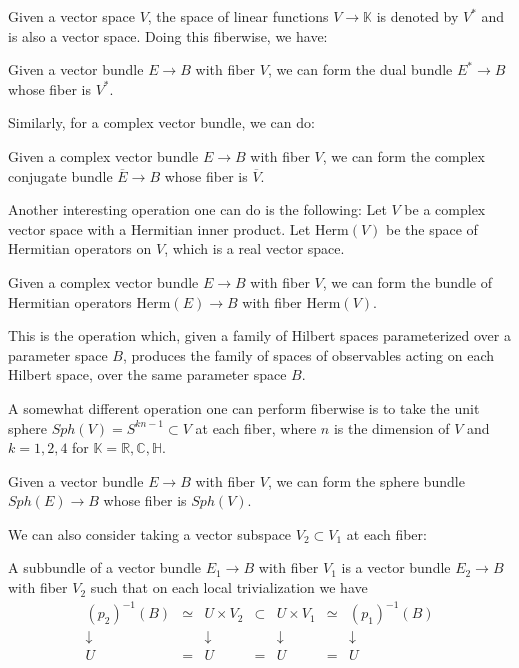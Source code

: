 \documentclass[12pt]{article}
\numberwithin{equation}{section}
\theoremstyle{remark}
\def\bC{\mathbb{C}}
\def\bH{\mathbb{H}}
\def\bK{\mathbb{K}}
\def\bR{\mathbb{R}}
\let\bar\overline
\begin{document}
Given a vector space $V$, the space of linear functions $V\to \bK$ is denoted by $V^*$
and is also a  vector space.
Doing this fiberwise, we have:
\begin{definition}
  Given a vector bundle $E\to B$ with fiber $V$,
  we can form the dual bundle $E^*\to B$ whose fiber is $V^*$.
\end{definition}
Similarly, for a complex vector bundle, we can do:
\begin{definition}
  Given a complex vector bundle $E\to B$ with fiber $V$,
  we can form the complex conjugate bundle $\bar E\to B$ whose fiber is $\bar V$.
\end{definition}


Another interesting operation one can do is the following:
Let $V$ be a complex vector space with a Hermitian inner product.
Let $\mathrm{Herm}(V)$ be the space of Hermitian operators on $V$,
which is a real vector space.
\begin{definition}
  Given a complex vector bundle $E\to B$ with fiber $V$,
  we can form the bundle of Hermitian operators $\mathrm{Herm}(E)\to B$ with fiber $\mathrm{Herm}(V)$.
\end{definition}
This is the operation which, given a family of Hilbert spaces parameterized over 
a parameter space $B$,
produces the family of spaces of observables acting on each Hilbert space, over the same parameter space $B$.

A somewhat different operation one can perform fiberwise 
is to take the unit sphere $Sph(V)=S^{kn-1} \subset V$ at each fiber, where $n$ is the dimension of $V$
and $k=1,2,4$ for $\bK=\bR,\bC,\bH$.
\begin{definition}
  Given a vector bundle $E\to B$ with fiber $V$,
  we can form the sphere bundle $Sph(E)\to B$ whose fiber is $Sph(V)$.
\end{definition}

We can also consider taking a vector subspace $V_2\subset V_1$ at each fiber:
\begin{definition}
A subbundle of a vector bundle $E_1\to B$ with fiber $V_1$ is 
a vector bundle $E_2\to B$ with fiber $V_2$ such that on each local trivialization 
we have 
\begin{equation}
  \begin{array}{cccccccc}
    (p_2)^{-1}(B) &\simeq & U\times V_2 & \subset  & U\times V_1 &\simeq & (p_1)^{-1}(B) \\ 
    \downarrow & & \downarrow & & \downarrow & & \downarrow \\
    U & = & U & = & U & = & U
  \end{array}
  \end{equation}
\end{definition}
\end{document}
